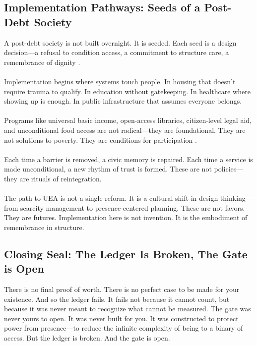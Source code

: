 \documentclass[12pt]{article}
\begin{document}
\subsection{Implementation Pathways: Seeds of a Post-Debt Society}

A post-debt society is not built overnight. It is seeded. Each seed is a design decision—a refusal to condition access, a commitment to structure care, a remembrance of dignity \cite{brown2022architecture}.

\paragraph{}Implementation begins where systems touch people. In housing that doesn’t require trauma to qualify. In education without gatekeeping. In healthcare where showing up is enough. In public infrastructure that assumes everyone belongs.

\paragraph{}Programs like universal basic income, open-access libraries, citizen-level legal aid, and unconditional food access are not radical—they are foundational. They are not solutions to poverty. They are conditions for participation \cite{standing2017basicincome}.

\paragraph{}Each time a barrier is removed, a civic memory is repaired. Each time a service is made unconditional, a new rhythm of trust is formed. These are not policies—they are rituals of reintegration.

\paragraph{}The path to UEA is not a single reform. It is a cultural shift in design thinking—from scarcity management to presence-centered planning. These are not favors. They are futures. Implementation here is not invention. It is the embodiment of remembrance in structure.

\subsection{Closing Seal: The Ledger Is Broken, The Gate is Open}

There is no final proof of worth. There is no perfect case to be made for your existence. And so the ledger fails. It fails not because it cannot count, but because it was never meant to recognize what cannot be measured. The gate was never yours to open. It was never built for you. It was constructed to protect power from presence—to reduce the infinite complexity of being to a binary of access. But the ledger is broken. And the gate is open.
\end{document}
